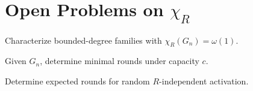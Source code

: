 \section{Open Problems on $\chi_R$}

\begin{problem}
Characterize bounded-degree families with $\chi_R(G_n)=\omega(1)$.
\end{problem}

\begin{problem}
Given $G_n$, determine minimal rounds under capacity $c$.
\end{problem}

\begin{problem}
Determine expected rounds for random $R$-independent activation.
\end{problem}
